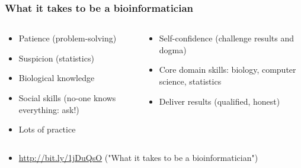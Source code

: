 \documentclass[table]{beamer}
\begin{document}
  \begin{frame}
    \frametitle{What it takes to be a bioinformatician}
    \begin{columns}[t]
      \begin{column}{5cm}
        \begin{itemize}
          \item Patience (problem-solving)
          \item Suspicion (statistics)
          \item Biological knowledge
          \item Social skills (no-one knows everything: ask!)
	      \item Lots of practice          
	    \end{itemize}
	  \end{column}
	  \begin{column}{5cm}
	    \begin{itemize}
	      \item Self-confidence (challenge results and dogma)
	      \item Core domain skills: biology, computer science, statistics
	      \item Deliver results (qualified, honest)
	    \end{itemize}
	  \end{column}
	\end{columns}
	\begin{itemize}
	  \item \url{http://bit.ly/1jDuQsO} ("What it takes to be a bioinformatician")
	\end{itemize}
  \end{frame}
\end{document}

